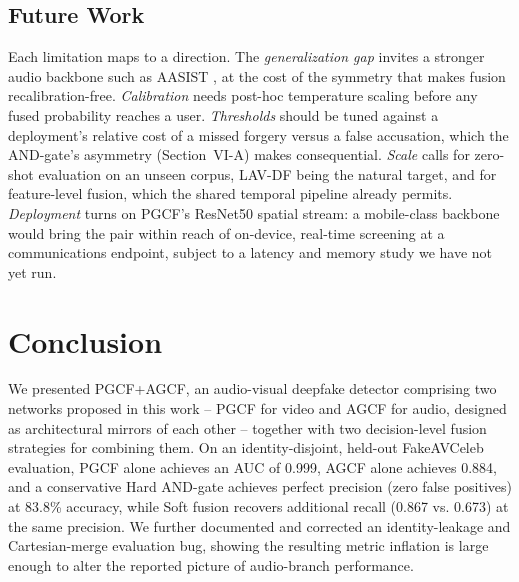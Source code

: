 \documentclass[conference]{IEEEtran}
\begin{document}
\subsection{Future Work}
Each limitation maps to a direction. The \emph{generalization gap} invites a stronger audio backbone such as AASIST \cite{jung2022aasist}, at the cost of the symmetry that makes fusion recalibration-free. \emph{Calibration} needs post-hoc temperature scaling before any fused probability reaches a user. \emph{Thresholds} should be tuned against a deployment's relative cost of a missed forgery versus a false accusation, which the AND-gate's asymmetry (Section~VI-A) makes consequential. \emph{Scale} calls for zero-shot evaluation on an unseen corpus, LAV-DF \cite{cai2022lavdf} being the natural target, and for feature-level fusion, which the shared temporal pipeline already permits. \emph{Deployment} turns on PGCF's ResNet50 spatial stream: a mobile-class backbone would bring the pair within reach of on-device, real-time screening at a communications endpoint, subject to a latency and memory study we have not yet run.

\section{Conclusion}
We presented PGCF+AGCF, an audio-visual deepfake detector comprising two networks proposed in this work -- PGCF for video and AGCF for audio, designed as architectural mirrors of each other -- together with two decision-level fusion strategies for combining them. On an identity-disjoint, held-out FakeAVCeleb evaluation, PGCF alone achieves an AUC of 0.999, AGCF alone achieves 0.884, and a conservative Hard AND-gate achieves perfect precision (zero false positives) at 83.8\% accuracy, while Soft fusion recovers additional recall (0.867 vs. 0.673) at the same precision. We further documented and corrected an identity-leakage and Cartesian-merge evaluation bug, showing the resulting metric inflation is large enough to alter the reported picture of audio-branch performance.
\end{document}
